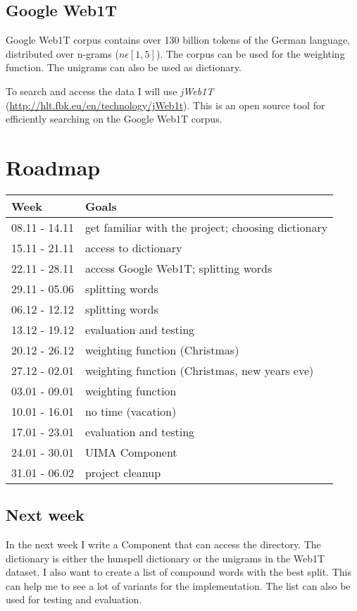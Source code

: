 \documentclass[11pt, accentcolor=tud9b, nochapname]{tudexercise}
\begin{document}
\subsection{Google Web1T}
Google Web1T corpus contains over 130 billion tokens of the German
language, distributed over n-grams ($n \epsilon [1,5]$). The corpus
can be used for the weighting function. The unigrams can also be used
as dictionary.

To search and access the data I will use \emph{jWeb1T}
(\url{http://hlt.fbk.eu/en/technology/jWeb1t}). This is an open source
  tool for efficiently searching on the Google Web1T corpus.

\section{Roadmap}

\begin{longtable}{|l|l|}
\hline
\textbf{Week} & \textbf{Goals} \\ \hline
08.11 - 14.11 & get familiar with the project; choosing dictionary \\ \hline
15.11 - 21.11 & access to dictionary \\ \hline
22.11 - 28.11 & access Google Web1T; splitting words \\ \hline
29.11 - 05.06 & splitting words \\ \hline
06.12 - 12.12 & splitting words \\ \hline
13.12 - 19.12 & evaluation and testing \\ \hline
20.12 - 26.12 & weighting function (Christmas) \\ \hline
27.12 - 02.01 & weighting function (Christmas, new years eve) \\ \hline
03.01 - 09.01 & weighting function \\ \hline
10.01 - 16.01 & no time (vacation) \\ \hline
17.01 - 23.01 & evaluation and testing \\ \hline
24.01 - 30.01 & UIMA Component \\ \hline
31.01 - 06.02 & project cleanup \\
\hline
\end{longtable}

\subsection{Next week}
In the next week I write a Component that can access the
directory. The dictionary is either the hunspell dictionary or the
unigrams in the Web1T dataset. I also want to create a list of
compound words with the best split. This can help me to see a lot of
variants for the implementation. The list can also be used for testing
and evaluation.




\end{document}

